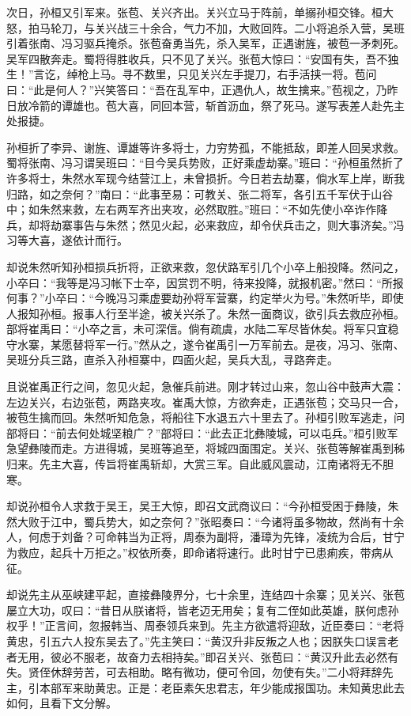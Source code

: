 次日，孙桓又引军来。张苞、关兴齐出。关兴立马于阵前，单搦孙桓交锋。桓大怒，拍马轮刀，与关兴战三十余合，气力不加，大败回阵。二小将追杀入营，吴班引着张南、冯习驱兵掩杀。张苞奋勇当先，杀入吴军，正遇谢旌，被苞一矛刺死。吴军四散奔走。蜀将得胜收兵，只不见了关兴。张苞大惊曰：“安国有失，吾不独生！”言讫，绰枪上马。寻不数里，只见关兴左手提刀，右手活挟一将。苞问曰：“此是何人？”兴笑答曰：“吾在乱军中，正遇仇人，故生擒来。”苞视之，乃昨日放冷箭的谭雄也。苞大喜，同回本营，斩首沥血，祭了死马。遂写表差人赴先主处报捷。

孙桓折了李异、谢旌、谭雄等许多将士，力穷势孤，不能抵敌，即差人回吴求救。蜀将张南、冯习谓吴班曰：“目今吴兵势败，正好乘虚劫寨。”班曰：“孙桓虽然折了许多将士，朱然水军现今结营江上，未曾损折。今日若去劫寨，倘水军上岸，断我归路，如之奈何？”南曰：“此事至易：可教关、张二将军，各引五千军伏于山谷中；如朱然来救，左右两军齐出夹攻，必然取胜。”班曰：“不如先使小卒诈作降兵，却将劫寨事告与朱然；然见火起，必来救应，却令伏兵击之，则大事济矣。”冯习等大喜，遂依计而行。

却说朱然听知孙桓损兵折将，正欲来救，忽伏路军引几个小卒上船投降。然问之，小卒曰：“我等是冯习帐下士卒，因赏罚不明，待来投降，就报机密。”然曰：“所报何事？”小卒曰：“今晚冯习乘虚要劫孙将军营寨，约定举火为号。”朱然听毕，即使人报知孙桓。报事人行至半途，被关兴杀了。朱然一面商议，欲引兵去救应孙桓。部将崔禹曰：“小卒之言，未可深信。倘有疏虞，水陆二军尽皆休矣。将军只宜稳守水寨，某愿替将军一行。”然从之，遂令崔禹引一万军前去。是夜，冯习、张南、吴班分兵三路，直杀入孙桓寨中，四面火起，吴兵大乱，寻路奔走。

且说崔禹正行之间，忽见火起，急催兵前进。刚才转过山来，忽山谷中鼓声大震：左边关兴，右边张苞，两路夹攻。崔禹大惊，方欲奔走，正遇张苞；交马只一合，被苞生擒而回。朱然听知危急，将船往下水退五六十里去了。孙桓引败军逃走，问部将曰：“前去何处城坚粮广？”部将曰：“此去正北彝陵城，可以屯兵。”桓引败军急望彝陵而走。方进得城，吴班等追至，将城四面围定。关兴、张苞等解崔禹到秭归来。先主大喜，传旨将崔禹斩却，大赏三军。自此威风震动，江南诸将无不胆寒。

却说孙桓令人求救于吴王，吴王大惊，即召文武商议曰：“今孙桓受困于彝陵，朱然大败于江中，蜀兵势大，如之奈何？”张昭奏曰：“今诸将虽多物故，然尚有十余人，何虑于刘备？可命韩当为正将，周泰为副将，潘璋为先锋，凌统为合后，甘宁为救应，起兵十万拒之。”权依所奏，即命诸将速行。此时甘宁已患痢疾，带病从征。

却说先主从巫峡建平起，直接彝陵界分，七十余里，连结四十余寨；见关兴、张苞屡立大功，叹曰：“昔日从朕诸将，皆老迈无用矣；复有二侄如此英雄，朕何虑孙权乎！”正言间，忽报韩当、周泰领兵来到。先主方欲遣将迎敌，近臣奏曰：“老将黄忠，引五六人投东吴去了。”先主笑曰：“黄汉升非反叛之人也；因朕失口误言老者无用，彼必不服老，故奋力去相持矣。”即召关兴、张苞曰：“黄汉升此去必然有失。贤侄休辞劳苦，可去相助。略有微功，便可令回，勿使有失。”二小将拜辞先主，引本部军来助黄忠。正是：老臣素矢忠君志，年少能成报国功。未知黄忠此去如何，且看下文分解。